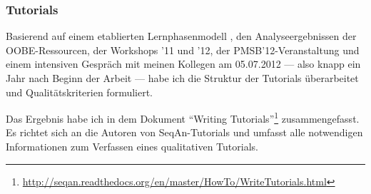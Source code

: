 \subsubsection{Tutorials}
\label{sec:tutorials-improve}

Basierend auf einem etablierten \citep[u.a.][]{Reardon:2008wl,aggarwal2009essentials} Lernphasenmodell \citep{Gagne:1985tx}, den Analyseergebnissen der OOBE-Ressourcen, der Workshops '11 und '12, der PMSB'12-Veranstaltung und einem intensiven Gespräch mit meinen Kollegen am 05.07.2012 --- also knapp ein Jahr nach Beginn der Arbeit --- habe ich die Struktur der Tutorials überarbeitet und Qualitätskriterien formuliert.

Das Ergebnis habe ich in dem Dokument ``Writing Tutorials''\footnote{\url{http://seqan.readthedocs.org/en/master/HowTo/WriteTutorials.html}} zusammengefasst. Es richtet sich an die Autoren von SeqAn-Tutorials und umfasst alle notwendigen Informationen zum Verfassen eines qualitativen Tutorials.

